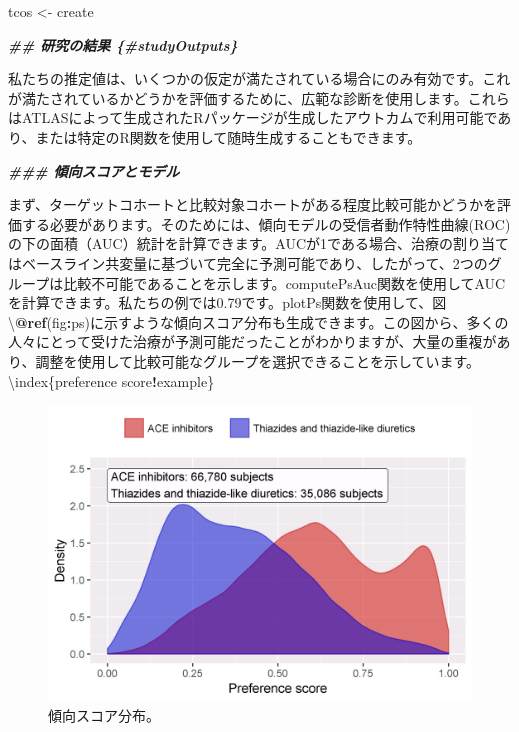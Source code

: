 \documentclass[
  11pt]{book}
\newenvironment{Shaded}{\begin{snugshade}}{\end{snugshade}}
\newcommand{\AttributeTok}[1]{\textcolor[rgb]{0.13,0.29,0.53}{#1}}
\newcommand{\DecValTok}[1]{\textcolor[rgb]{0.00,0.00,0.81}{#1}}
\newcommand{\DocumentationTok}[1]{\textcolor[rgb]{0.56,0.35,0.01}{\textbf{\textit{#1}}}}
\newcommand{\FloatTok}[1]{\textcolor[rgb]{0.00,0.00,0.81}{#1}}
\newcommand{\FunctionTok}[1]{\textcolor[rgb]{0.13,0.29,0.53}{\textbf{#1}}}
\newcommand{\NormalTok}[1]{#1}
\newcommand{\OtherTok}[1]{\textcolor[rgb]{0.56,0.35,0.01}{#1}}
\newcommand{\SpecialCharTok}[1]{\textcolor[rgb]{0.81,0.36,0.00}{\textbf{#1}}}
\newcommand{\StringTok}[1]{\textcolor[rgb]{0.31,0.60,0.02}{#1}}
\theoremstyle{definition}
\theoremstyle{definition}
\theoremstyle{definition}
\theoremstyle{definition}
\theoremstyle{remark}
\begin{document}
\begin{Shaded}
\begin{Highlighting}[]
\NormalTok{tcos }\OtherTok{\textless{}{-}}\NormalTok{ create}

\DocumentationTok{\#\# 研究の結果 \{\#studyOutputs\}}

\NormalTok{私たちの推定値は、いくつかの仮定が満たされている場合にのみ有効です。これが満たされているかどうかを評価するために、広範な診断を使用します。これらはATLASによって生成されたRパッケージが生成したアウトカムで利用可能であり、または特定のR関数を使用して随時生成することもできます。}

\DocumentationTok{\#\#\# 傾向スコアとモデル}

\NormalTok{まず、ターゲットコホートと比較対象コホートがある程度比較可能かどうかを評価する必要があります。そのためには、傾向モデルの受信者動作特性曲線(ROC)の下の面積（AUC）統計を計算できます。AUCが1である場合、治療の割り当てはベースライン共変量に基づいて完全に予測可能であり、したがって、}\DecValTok{2}\NormalTok{つのグループは比較不可能であることを示します。}\StringTok{\textasciigrave{}}\AttributeTok{computePsAuc}\StringTok{\textasciigrave{}}\NormalTok{関数を使用してAUCを計算できます。私たちの例では0}\FloatTok{.79}\NormalTok{です。}\StringTok{\textasciigrave{}}\AttributeTok{plotPs}\StringTok{\textasciigrave{}}\NormalTok{関数を使用して、図 \textbackslash{}}\SpecialCharTok{@}\FunctionTok{ref}\NormalTok{(fig}\SpecialCharTok{:}\NormalTok{ps)に示すような傾向スコア分布も生成できます。この図から、多くの人々にとって受けた治療が予測可能だったことがわかりますが、大量の重複があり、調整を使用して比較可能なグループを選択できることを示しています。 \textbackslash{}index\{preference score}\SpecialCharTok{!}\NormalTok{example\}}
\end{Highlighting}
\end{Shaded}

\begin{figure}

{\centering \includegraphics[width=0.8\linewidth]{images/PopulationLevelEstimation/ps} 

}

\caption{傾向スコア分布。}\label{fig:ps}
\end{figure}
\end{document}
